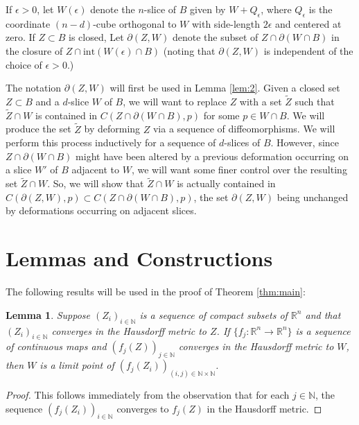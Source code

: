 \documentclass[10pt]{amsart}
\newtheorem{lem}[thm]{Lemma}
\theoremstyle{definition}
\theoremstyle{definition}
\theoremstyle{definition}
\theoremstyle{definition}
\theoremstyle{definition}
\theoremstyle{definition}
\theoremstyle{definition}
\newcommand{\R}{\ensuremath{\mathbb{R}}}
\newcommand{\N}{\ensuremath{\mathbb{N}}}
\newcommand{\<}{\langle}
\renewcommand{\>}{\rangle}
\def\fr{\partial}
\def\e{\epsilon}
\begin{document}
If \( \e>0 \), let \( W(\e) \) denote the \( n \)-slice of \( B \) given by \( W+Q_\e \), where \( Q_\e \) is the coordinate \( (n-d) \)-cube orthogonal to \( W \) with side-length \( 2\e \) and centered at zero. If \( Z\subset B \) is closed, Let \( \fr(Z,W) \) denote the subset of \( Z\cap \fr(W\cap B) \) in the closure of \( Z\cap \textrm{int}\left(W(\e)\cap B\right) \) (noting that \( \fr(Z,W) \) is independent of the choice of \( \e>0 \).)

The notation \( \fr(Z,W) \) will first be used in Lemma \ref{lem:2}. Given a closed set \( Z\subset B \) and a \( d \)-slice \( W \) of \( B \), we will want to replace \( Z \) with a set \( \tilde{Z} \) such that \( \tilde{Z}\cap W \) is contained in \( C(Z\cap \fr(W\cap B),p) \) for some \( p\in W\cap B \). We will produce the set \( \tilde{Z} \) by deforming \( Z \) via a sequence of diffeomorphisms. We will perform this process inductively for a sequence of \( d \)-slices of \( B \). However, since \( Z\cap \fr(W\cap B) \) might have been altered by a previous deformation occurring on a slice \( W' \) of \( B \) adjacent to \( W \), we will want some finer control over the resulting set \( \tilde{Z}\cap W \). So, we will show that \( \tilde{Z}\cap W \) is actually contained in \( C(\fr(Z,W),p)\subset C(Z\cap \fr(W\cap B),p) \), the set \( \fr(Z,W) \) being unchanged by deformations occurring on adjacent slices.

\section{Lemmas and Constructions}
The following results will be used in the proof of Theorem \ref{thm:main}:

\begin{lem}
	\label{lem:1}
	Suppose \( (Z_i)_{i\in \N} \) is a sequence of compact subsets of \( \R^n \) and that \( (Z_i)_{i\in \N} \) converges in the Hausdorff metric to \( Z \). If \( \{f_j: \R^n\to \R^n \} \) is a sequence of continuous maps and \( (f_j(Z))_{j\in \N} \) converges in the Hausdorff metric to \( W \), then \( W \) is a limit point of \( (f_j(Z_i))_{(i,j)\in \N\times \N} \).
\end{lem}

\begin{proof}
	This follows immediately from the observation that for each \( j\in \N \), the sequence \( (f_j(Z_i))_{i\in \N} \) converges to \( f_j(Z) \) in the Hausdorff metric.
\end{proof}
\end{document}
